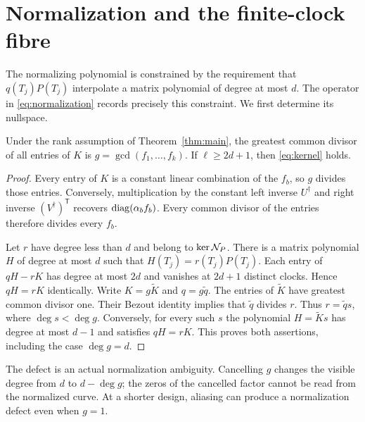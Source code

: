 \section{Normalization and the finite-clock fibre}
\label{sec:polynomial}
The normalizing polynomial is constrained by the requirement that
$q(T_j)P(T_j)$ interpolate a matrix polynomial of degree at most $d$.
The operator in \eqref{eq:normalization} records precisely this
constraint. We first determine its nullspace.

\begin{lemma}\label{lem:defect}
Under the rank assumption of Theorem~\ref{thm:main}, the greatest common
divisor of all entries of $K$ is $g=\gcd(f_1,\ldots,f_k)$. If
$\ell\ge2d+1$, then \eqref{eq:kernel} holds.
\end{lemma}
\begin{proof}
Every entry of $K$ is a constant linear combination of the $f_b$, so
$g$ divides those entries. Conversely, multiplication by the constant
left inverse $U^\dagger$ and right inverse $(V^\dagger)^{\mathsf T}$
recovers $\operatorname{diag}(\alpha_b f_b)$. Every common divisor of the entries
therefore divides every $f_b$.

Let $r$ have degree less than $d$ and belong to $\ker\mathcal N_P$.
There is a matrix polynomial $H$ of degree at most $d$ such that
$H(T_j)=r(T_j)P(T_j)$. Each entry of $qH-rK$ has degree at most $2d$
and vanishes at $2d+1$ distinct clocks. Hence $qH=rK$ identically.
Write $K=g\widetilde K$ and $q=g\widetilde q$. The entries of
$\widetilde K$ have greatest common divisor one. Their Bezout identity
implies that $\widetilde q$ divides $r$. Thus $r=\widetilde q s$,
where $\deg s<\deg g$. Conversely, for every such $s$ the polynomial
$H=\widetilde K s$ has degree at most $d-1$ and satisfies $qH=rK$.
This proves both assertions, including the case $\deg g=d$.
\end{proof}

The defect is an actual normalization ambiguity. Cancelling $g$ changes
the visible degree from $d$ to $d-\deg g$; the zeros of the cancelled
factor cannot be read from the normalized curve. At a shorter design,
aliasing can produce a normalization defect even when $g=1$.

